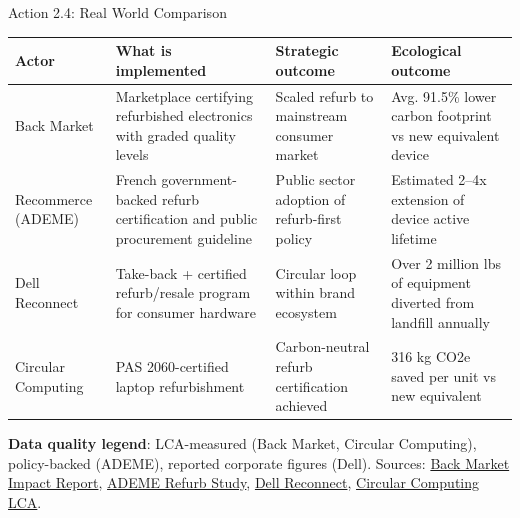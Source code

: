 \documentclass[aspectratio=169]{beamer}
\begin{document}

\begin{frame}{Action 2.4: Real World Comparison}
\scriptsize
\begin{tabular}{p{2.1cm}p{2.8cm}p{2.4cm}p{3.3cm}}
\toprule
Actor & What is implemented & Strategic outcome & Ecological outcome \\
\midrule
Back Market & Marketplace certifying refurbished electronics with graded quality levels & Scaled refurb to mainstream consumer market & Avg. 91.5\% lower carbon footprint vs new equivalent device \\
Recommerce (ADEME) & French government-backed refurb certification and public procurement guideline & Public sector adoption of refurb-first policy & Estimated 2--4x extension of device active lifetime \\
Dell Reconnect & Take-back + certified refurb/resale program for consumer hardware & Circular loop within brand ecosystem & Over 2 million lbs of equipment diverted from landfill annually \\
Circular Computing & PAS 2060-certified laptop refurbishment & Carbon-neutral refurb certification achieved & 316 kg CO2e saved per unit vs new equivalent \\
\bottomrule
\end{tabular}

\vspace{0.15cm}
\textbf{Data quality legend}: LCA-measured (Back Market, Circular Computing), policy-backed (ADEME), reported corporate figures (Dell).
\vspace{0.08cm}
\tiny Sources: \href{https://assets.ctfassets.net/mmeshd7gafk1/5A4644sbPjCAjENnnu91Vy/deda4195892315a31307337ce1932ca1/BM-IMPACTREPORT-USA.pdf}{Back Market Impact Report}, \href{https://librairie.ademe.fr/economie-circulaire-et-dechets/5833-assessment-of-the-environmental-impact-of-a-set-of-refurbished-products.html}{ADEME Refurb Study}, \href{https://www.dell.com/en-us/dfh/lp/outlet-why-refurbished}{Dell Reconnect}, \href{https://circularcomputing.com/news/carbon-footprint-laptop/}{Circular Computing LCA}.
\end{frame}

\end{document}
